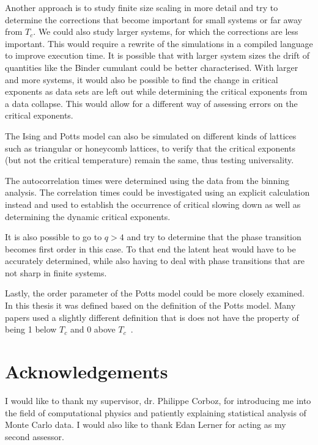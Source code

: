 \documentclass[11pt, a4paper]{report} %
\begin{document}
Another approach is to study finite size scaling in more detail and try to determine the corrections that become important for small systems or far away from \(T_c\).
We could also study larger systems, for which the corrections are less important.
This would require a rewrite of the simulations in a compiled language to improve execution time.
It is possible that with larger system sizes the drift of quantities like the Binder cumulant could be better characterised.
With larger and more systems, it would also be possible to find the change in critical exponents as data sets are left out while determining the critical exponents from a data collapse.
This would allow for a different way of assessing errors on the critical exponents.

The Ising and Potts model can also be simulated on different kinds of lattices such as triangular or honeycomb lattices, to verify that the critical exponents (but not the critical temperature) remain the same, thus testing universality.

The autocorrelation times were determined using the data from the binning analysis.
The correlation times could be investigated using an explicit calculation instead and used to establish the occurrence of critical slowing down as well as determining the dynamic critical exponents.

It is also possible to go to \(q > 4\) and try to determine that the phase transition becomes first order in this case.
To that end the latent heat would have to be accurately determined, while also having to deal with phase transitions that are not sharp in finite systems.

Lastly, the order parameter of the Potts model could be more closely examined.
In this thesis it was defined based on the definition of the Potts model.
Many papers used a slightly different definition that is does not have the property of being 1 below \(T_c\) and 0 above \(T_c\)~\cite{binder:1981a,wu:1982,fan:2007}.

\section{Acknowledgements}
I would like to thank my supervisor, dr. Philippe Corboz, for introducing me into the field of computational physics and patiently explaining statistical analysis of Monte Carlo data.
I would also like to thank Edan Lerner for acting as my second assessor.


\printbibliography
\end{document}

